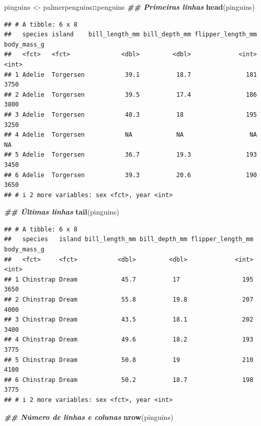 \documentclass[
]{article}
\newenvironment{Shaded}{\begin{snugshade}}{\end{snugshade}}
\newcommand{\DocumentationTok}[1]{\textcolor[rgb]{0.56,0.35,0.01}{\textbf{\textit{#1}}}}
\newcommand{\FunctionTok}[1]{\textcolor[rgb]{0.13,0.29,0.53}{\textbf{#1}}}
\newcommand{\NormalTok}[1]{#1}
\newcommand{\OtherTok}[1]{\textcolor[rgb]{0.56,0.35,0.01}{#1}}
\newcommand{\SpecialCharTok}[1]{\textcolor[rgb]{0.81,0.36,0.00}{\textbf{#1}}}
\begin{document}
\begin{Shaded}
\begin{Highlighting}[]
\NormalTok{pinguins }\OtherTok{\textless{}{-}}\NormalTok{ palmerpenguins}\SpecialCharTok{::}\NormalTok{penguins}
\DocumentationTok{\#\# Primeiras linhas}
\FunctionTok{head}\NormalTok{(pinguins)}
\end{Highlighting}
\end{Shaded}

\begin{verbatim}
## # A tibble: 6 x 8
##   species island    bill_length_mm bill_depth_mm flipper_length_mm body_mass_g
##   <fct>   <fct>              <dbl>         <dbl>             <int>       <int>
## 1 Adelie  Torgersen           39.1          18.7               181        3750
## 2 Adelie  Torgersen           39.5          17.4               186        3800
## 3 Adelie  Torgersen           40.3          18                 195        3250
## 4 Adelie  Torgersen           NA            NA                  NA          NA
## 5 Adelie  Torgersen           36.7          19.3               193        3450
## 6 Adelie  Torgersen           39.3          20.6               190        3650
## # i 2 more variables: sex <fct>, year <int>
\end{verbatim}

\begin{Shaded}
\begin{Highlighting}[]
\DocumentationTok{\#\# Últimas linhas}
\FunctionTok{tail}\NormalTok{(pinguins)}
\end{Highlighting}
\end{Shaded}

\begin{verbatim}
## # A tibble: 6 x 8
##   species   island bill_length_mm bill_depth_mm flipper_length_mm body_mass_g
##   <fct>     <fct>           <dbl>         <dbl>             <int>       <int>
## 1 Chinstrap Dream            45.7          17                 195        3650
## 2 Chinstrap Dream            55.8          19.8               207        4000
## 3 Chinstrap Dream            43.5          18.1               202        3400
## 4 Chinstrap Dream            49.6          18.2               193        3775
## 5 Chinstrap Dream            50.8          19                 210        4100
## 6 Chinstrap Dream            50.2          18.7               198        3775
## # i 2 more variables: sex <fct>, year <int>
\end{verbatim}

\begin{Shaded}
\begin{Highlighting}[]
\DocumentationTok{\#\# Número de linhas e colunas}
\FunctionTok{nrow}\NormalTok{(pinguins)}
\end{Highlighting}
\end{Shaded}
\end{document}
